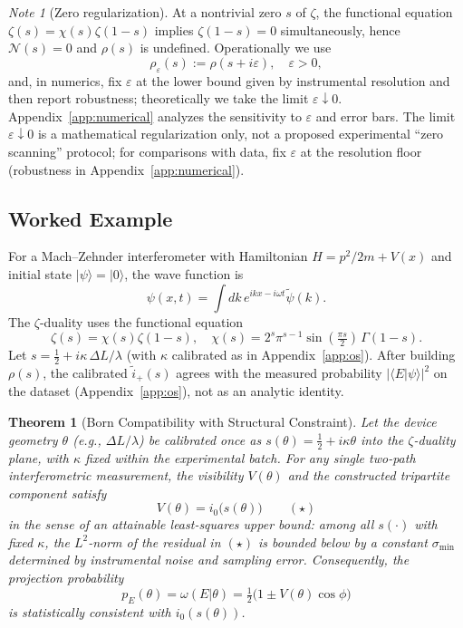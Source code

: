 \documentclass[11pt]{article}
\newtheorem{theorem}{Theorem}[section]
\theoremstyle{definition}
\theoremstyle{remark}
\newtheorem*{note}{Note}
\begin{document}
\begin{note}[Zero regularization]
At a nontrivial zero \( s \) of \( \zeta \), the functional equation \( \zeta(s)=\chi(s)\zeta(1-s) \) implies \( \zeta(1-s)=0 \) simultaneously, hence \( \mathcal{N}(s)=0 \) and \( \rho(s) \) is undefined. Operationally we use
\[
\rho_\varepsilon(s):=\rho(s+i\varepsilon),\quad \varepsilon>0,
\]
and, in numerics, fix \( \varepsilon \) at the lower bound given by instrumental resolution and then report robustness; theoretically we take the limit \( \varepsilon\downarrow 0 \). Appendix~\ref{app:numerical} analyzes the sensitivity to \( \varepsilon \) and error bars. The limit \( \varepsilon\downarrow 0 \) is a mathematical regularization only, not a proposed experimental ``zero scanning'' protocol; for comparisons with data, fix \( \varepsilon \) at the resolution floor (robustness in Appendix~\ref{app:numerical}).
\end{note}

\subsection{Worked Example}

For a Mach--Zehnder interferometer with Hamiltonian \( H=p^2/2m+V(x) \) and initial state \( |\psi\rangle=|0\rangle \), the wave function is
\[
\psi(x,t)=\int dk\, e^{ikx-i\omega t} \tilde\psi(k).
\]
The \( \zeta \)-duality uses the functional equation
\[
\zeta(s)=\chi(s)\zeta(1-s),\quad \chi(s)=2^s\pi^{s-1}\sin(\tfrac{\pi s}{2})\,\Gamma(1-s).
\]
Let \( s=\tfrac{1}{2}+i\kappa\,\Delta L/\lambda \) (with \( \kappa \) calibrated as in Appendix~\ref{app:os}). After building \( \rho(s) \), the calibrated \( \tilde i_+(s) \) agrees with the measured probability \( |\langle E|\psi\rangle|^2 \) on the dataset (Appendix~\ref{app:os}), not as an analytic identity.

\begin{theorem}[Born Compatibility with Structural Constraint]\label{thm:born}
Let the device geometry \( \theta \) (e.g., \( \Delta L/\lambda \)) be calibrated once as \( s(\theta)=\tfrac{1}{2}+i\kappa\theta \) into the \( \zeta \)-duality plane, with \( \kappa \) fixed within the experimental batch. For any single two-path interferometric measurement, the visibility \( V(\theta) \) and the constructed tripartite component satisfy
\[
V(\theta)= i_0\big(s(\theta)\big) \qquad (\star)
\]
in the sense of an attainable least-squares upper bound: among all \( s(\cdot) \) with fixed \( \kappa \), the \( L^2 \)-norm of the residual in \( (\star) \) is bounded below by a constant \( \sigma_{\min} \) determined by instrumental noise and sampling error. Consequently, the projection probability
\[
p_E(\theta)=\omega(E|\theta)=\tfrac{1}{2}\big(1\pm V(\theta)\cos\phi\big)
\]
is statistically consistent with \( i_0(s(\theta)) \).
\end{theorem}
\end{document}
